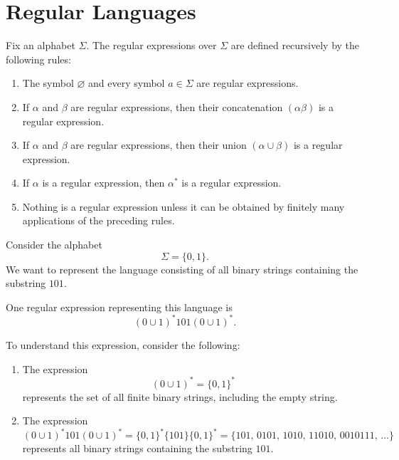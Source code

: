 \documentclass[10pt,a4paper]{article}
\begin{document}
\section{Regular Languages}
\begin{definition}
Fix an alphabet $\Sigma$. The regular expressions over $\Sigma$ are defined recursively by the following rules:
\begin{enumerate}
    \item[\textcolor{violet!70!black}{\textsf{R1.}}]
    The symbol $\varnothing$ and every symbol $a\in\Sigma$ are regular expressions.

    \item[\textcolor{violet!70!black}{\textsf{R2.}}]
    If $\alpha$ and $\beta$ are regular expressions, then their concatenation $(\alpha\beta)$ is a regular expression.

    \item[\textcolor{violet!70!black}{\textsf{R3.}}]
    If $\alpha$ and $\beta$ are regular expressions, then their union $(\alpha\cup\beta)$ is a regular expression.

    \item[\textcolor{violet!70!black}{\textsf{R4.}}]
    If $\alpha$ is a regular expression, then $\alpha^*$ is a regular expression.

    \item[\textcolor{violet!70!black}{\textsf{R5.}}]
    Nothing is a regular expression unless it can be obtained by finitely many applications of the preceding rules.
\end{enumerate}
\end{definition}

Consider the alphabet
\[
    \Sigma=\{0,1\}.
\]
We want to represent the language consisting of all binary strings containing the substring $101$.

One regular expression representing this language is
\[
    (0\cup1)^*101(0\cup1)^*.
\]

To understand this expression, consider the following:
\begin{enumerate}
    \item The expression
    \[
        (0\cup1)^*=\{0,1\}^*
    \]
    represents the set of all finite binary strings, including the empty string.

    \item The expression
    \[
        (0\cup1)^*101(0\cup1)^*
        =\{0,1\}^*\{101\}\{0,1\}^* = \{101,\,0101,\, 1010,\,
        11010,\, 0010111,\,\ldots\}
    \]
    represents all binary strings containing the substring $101$.
\end{enumerate}
\end{document}
